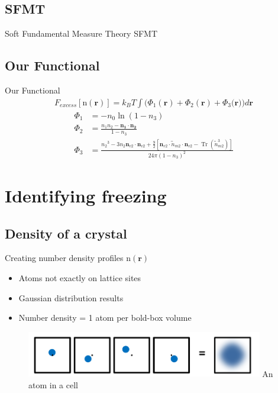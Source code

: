\documentclass{beamer}
\renewcommand{\vec}[1]{\mathbf{#1}}
\begin{document}
\subsection*{SFMT}
\begin{frame}{Soft Fundamental Measure Theory}
  SFMT
\end{frame}

\subsection*{Our Functional}
\begin{frame}{Our Functional}
    \begin{align}\label{eq:Fexfunctional}
        F_{excess}[\text{n}(\vec{r})]=k_BT\int(\Phi_1(\vec{r})+\Phi_2(\vec{r})+\Phi_3(\vec{r}{)) d}\vec{r}
     \end{align}
     \begin{align}
         \Phi_1 &= -n_{0}\ln(1-n_{3}) \\
         \Phi_2 &= \frac{n_{1}n_{2}-\vec{n_{1}}\cdot\vec{n_{2}}}{1-n_{3}} \\
         \Phi_3 &= \frac{{n_2}^3-3n_2\vec{n}_{v2}\cdot\vec{n}_{v2}+\frac{9}{2}[\vec{n}_{v2}\cdot{\overleftrightarrow{n}_{m2}}\cdot{\vec{n}_{v2}}-\operatorname{Tr}({\overleftrightarrow{n}^3_{m2}})]}{24\pi(1-n_3)^2}  
      \end{align} 
\end{frame}

\section*{Identifying freezing}
\subsection*{Density of a crystal}

\begin{frame}{Creating number density profiles $\text{n}(\vec r)$}
    \begin{itemize}
	    \item Atoms not exactly on lattice sites
		\item Gaussian distribution results
		\item Number density = 1 atom per bold-box volume
	\end{itemize}	
	
    \begin{figure}
       \centering
       \includegraphics[height=2cm]{Ensemble_Gaussian.png}
       \label{fig:Ensemble_Gaus}
        An atom in a cell
     \end{figure}     
\end{frame}	
\end{document}
